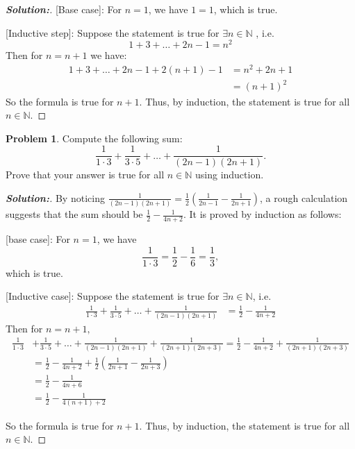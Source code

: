 \documentclass[12pt]{article}
\theoremstyle{definition}\newtheorem{problem}{Problem}
\newenvironment{solution}{\begin{proof}[\bfseries\textup{Solution:}]}{\end{proof}}
\begin{document}
\begin{solution}

[Base case]: For $ n = 1 $, we have $ 1 =1 $, which is true. 

[Inductive step]: Suppose the statement is true for $ \exists n \in \mathbb{N}  $ , i.e. 
\begin{equation} 1+ 3+ \dots + 2n-1 = n^2 \end{equation}
 Then for $ n = n+1 $  we have: 
\begin{align}
    1+3+\dots + 2n-1 + 2(n+1)-1 &= n^2 + 2n+1 \\
    &= (n+1)^2
\end{align}
So the formula is true for $ n+1 $. Thus, by induction, the statement is true for all $ n \in \mathbb{N} $.

\end{solution}

\newpage
\begin{problem}
Compute the following sum:
\begin{equation*}
\frac{1}{1\cdot 3} + \frac{1}{3\cdot 5} + \dots + \frac{1}{(2n-1)(2n+1)} .
\end{equation*}
Prove that your answer is true for all $n\in\mathbb{N}$ using induction.
\end{problem}


\begin{solution}
By noticing $\frac{1}{(2n-1)(2n+1)} = \frac{1}{2} (\frac{1}{2n-1} - \frac{1}{2n+1}) $, a rough calculation suggests that the sum should be $ \frac{1}{2} - \frac{1}{4n+2} $. It is proved by induction as follows: 

[base case]: For $ n=1 $, we have $$ \frac{1}{1\cdot 3} = \frac{1}{2} - \frac{1}{6} = \frac{1}{3}, $$ which is true. 

[Inductive case]: Suppose the statement is true for $ \exists n \in \mathbb{N} $, i.e. \begin{align} 
\frac{1}{1 \cdot 3} + \frac{1}{3 \cdot 5} + \dots + \frac{1}{(2n-1)(2n+1)} &= \frac{1}{2} - \frac{1}{4n+2}
\end{align}
 Then for $ n = n+1, $ \begin{align} 
\frac{1}{1 \cdot 3} &+ \frac{1}{3 \cdot 5} + \dots + \frac{1}{(2n-1)(2n+1)} + \frac{1}{(2n+1)(2n+3)} = \frac{1}{2} - \frac{1}{4n+2} + \frac{1}{(2n+1)(2n+3)}  \\ 
&= \frac{1}{2} - \frac{1}{4n+2} + \frac{1}{2} (\frac{1}{2n+1} - \frac{1}{2n+3}) \\
&= \frac{1}{2} - \frac{1}{4n + 6} \\&= \frac{1}{2} - \frac{1}{4(n+1) + 2} 
 \end{align}
  
So the formula is true for $ n+1 $. Thus, by induction, the statement is true for all $ n \in \mathbb{N} $.





\end{solution}
\end{document}
